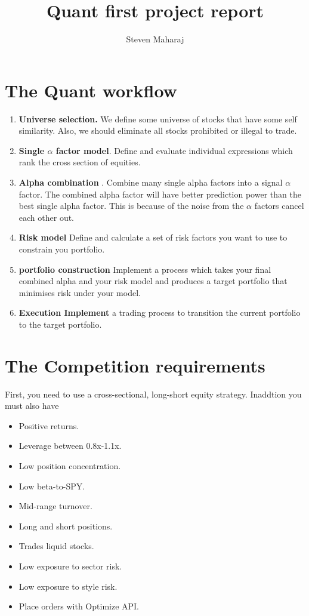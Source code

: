 \documentclass[10pt,a4paper]{article}
\author{Steven Maharaj}
\title{Quant first project report}
\begin{document}
\maketitle

\section{The Quant workflow}
\begin{enumerate}
\item \textbf{Universe selection.} We define some universe of stocks that have some self similarity. Also, we should eliminate all stocks prohibited or illegal to trade.

\item \textbf{Single $\alpha$ factor model}. Define and evaluate individual expressions which rank the cross section of equities. 

\item \textbf{Alpha combination	}. Combine many single alpha factors into a signal $\alpha$ factor.  The combined alpha factor will have better prediction power than the best single alpha factor. This is because of the noise from the $\alpha$ factors cancel each other out.

\item \textbf{Risk model} Define and calculate a set of risk factors you want to use to constrain you portfolio.

\item \textbf{portfolio construction} Implement a process which takes your final combined alpha and your risk model and produces a target portfolio that minimises risk under your model.

\item \textbf{Execution Implement} a trading process to transition the current portfolio to the target portfolio.
\end{enumerate}
\section{The Competition requirements}
First, you need to use a cross-sectional, long-short equity strategy. Inaddtion you must also have
\begin{itemize}

    \item Positive returns.
    \item Leverage between 0.8x-1.1x.
    \item Low position concentration.
    \item Low beta-to-SPY.
   \item Mid-range turnover.
   \item Long and short positions.
    \item Trades liquid stocks.
    \item Low exposure to sector risk.
   \item Low exposure to style risk.
   \item Place orders with Optimize API.

\end{itemize}
\end{document}
